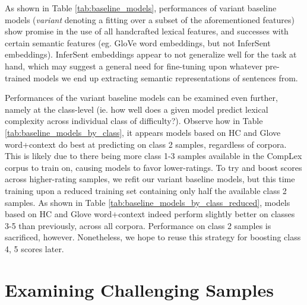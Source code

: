 \documentclass{dcthesis}
\theoremstyle{definition}
\theoremstyle{remark}
\begin{document}
As shown in Table \ref{tab:baseline_models}, performances of variant baseline models (\textit{variant} denoting a fitting over a subset of the aforementioned features) show promise in the use of all handcrafted lexical features, and successes with certain semantic features (eg. GloVe word embeddings, but not InferSent embeddings). InferSent embeddings appear to not generalize well for the task at hand, which may suggest a general need for fine-tuning upon whatever pre-trained models we end up extracting semantic representations of sentences from.

Performances of the variant baseline models can be examined even further, namely at the class-level (ie. how well does a given model predict lexical complexity across individual class of difficulty?). Observe how in Table \ref{tab:baseline_models_by_class}, it appears models based on HC and Glove word+context do best at predicting on class 2 samples, regardless of corpora. This is likely due to there being more class 1-3 samples available in the CompLex corpus to train on, causing models to favor lower-ratings. To try and boost scores across higher-rating samples, we refit our variant baseline models, but this time training upon a reduced training set containing only half the available class 2 samples. As shown in Table \ref{tab:baseline_models_by_class_reduced}, models based on HC and Glove word+context indeed perform slightly better on classes 3-5 than previously, across all corpora. Performance on class 2 samples is sacrificed, however. Nonetheless, we hope to reuse this strategy for boosting class 4, 5 scores later. 

\section{Examining Challenging Samples}

\label{sec:examining_challenging_samples}
\end{document}
